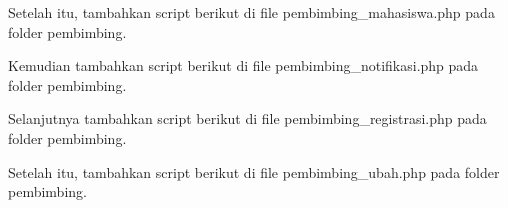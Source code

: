 \noindent
Setelah itu, tambahkan script berikut di file pembimbing\_mahasiswa.php pada folder pembimbing.


\noindent
Kemudian tambahkan script berikut di file pembimbing\_notifikasi.php pada folder pembimbing.


\noindent
Selanjutnya tambahkan script berikut di file pembimbing\_registrasi.php pada folder pembimbing.


\noindent
Setelah itu, tambahkan script berikut di file pembimbing\_ubah.php pada folder pembimbing.


